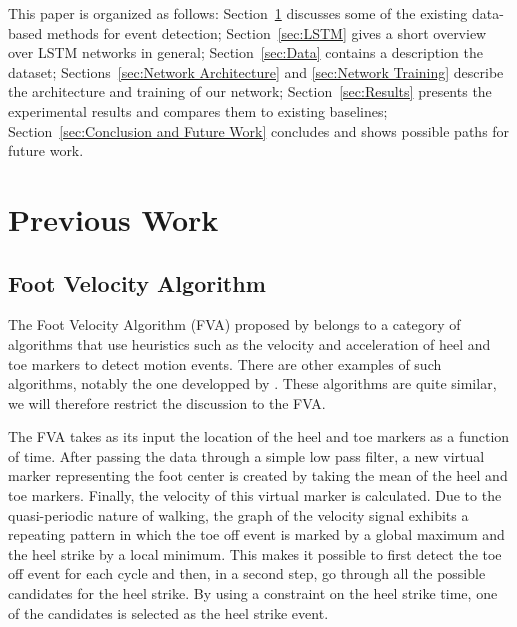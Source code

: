 \documentclass{acm_proc_article-sp}
\begin{document}
This paper is organized as follows:
Section~\ref{sec:Previous Work}
discusses some of the existing data-based methods for event detection;
Section~\ref{sec:LSTM}
gives a short overview over LSTM networks in general;
Section~\ref{sec:Data}
contains a description the dataset;
Sections~\ref{sec:Network Architecture} and \ref{sec:Network Training}
describe the architecture and training of our network;
Section~\ref{sec:Results}
presents the experimental results and compares them to existing baselines;
Section~\ref{sec:Conclusion and Future Work}
concludes and shows possible paths for future work.

\section{Previous Work}
\label{sec:Previous Work}

\subsection{Foot Velocity Algorithm}
\label{sub:Foot Velocity Algorithm}

The Foot Velocity Algorithm (FVA) proposed by
\citet{Oconnor2007}
belongs to a category of algorithms that use heuristics such as the velocity
and acceleration of heel and toe markers to detect motion events.
There are other examples of such algorithms, notably the one developped by
\citet{Hreljac2000}.
These algorithms are quite similar, we will therefore restrict the discussion
to the FVA.

The FVA takes as its input the location of the heel and toe markers as a
function of time.
After passing the data through a simple low pass filter,
a new virtual marker representing the foot center is created by taking the mean
of the heel and toe markers.
Finally, the velocity of this virtual marker is calculated.
Due to the quasi-periodic nature of walking, the graph of the velocity signal
exhibits a repeating pattern in which the toe off event is marked by a global
maximum and the heel strike by a local minimum.
This makes it possible to first detect the toe off event for each cycle and
then, in a second step, go through all the possible candidates for the heel
strike.
By using a constraint on the heel strike time, one of the candidates is selected
as the heel strike event.
\end{document}
